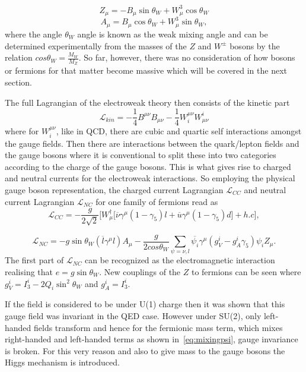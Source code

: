 \begin{equation}
	Z_{\mu}=-B_{\mu}\sin\theta_{W}+W^{3}_{\mu}\cos\theta_{W}
\end{equation}
\begin{equation}
	A_{\mu}= B_{\mu}\cos\theta_{W}+W^{3}_{\mu}\sin\theta_{W},
\end{equation}
where the angle $\theta_{W}$ angle is known as the weak mixing angle and can be determined experimentally from the masses of the $Z$ and $W^{\pm}$ bosons by the relation
$cos\theta_{W} = \frac{M_{W}}{M_{Z}}$. So far, however, there was no consideration of how bosons or fermions for that matter become massive which will be covered in the next section.

The full Lagrangian of the electroweak theory then consists of the kinetic part
\begin{equation}
\mathcal{L}_{kin}=  -\frac{1}{4} B^{\mu\nu}B_{\mu\nu} -\frac{1}{4} W_{i}^{\mu\nu}W^{i}_{\mu\nu}
\end{equation}
where for $W_{i}^{\mu\nu}$, like in \gls{QCD}, there are cubic and quartic self interactions amongst the gauge fields. Then there are interactions between the quark/lepton fields and the gauge bosons where it is conventional to split these into two categories according to the charge of the gauge bosons.
This is what gives rise to charged and neutral currents for the electroweak interactions. So employing the physical gauge boson representation, the charged current Lagrangian $\mathcal{L}_{CC}$ and neutral current Lagrangian $\mathcal{L}_{NC}$ for one family of fermions read as
\begin{equation}
	\mathcal{L}_{CC}= - \frac{g}{2\sqrt{2}}\Big[W_{\mu}^{\dagger}\big[\overline{\nu}\gamma^{\mu}(1-\gamma_{5})l + \overline{u}\gamma^{\mu}(1-\gamma_{5})d\big] + h.c\Big], 
\label{eq:LC}
\end{equation}

\begin{equation}
	\mathcal{L}_{NC}= - g \sin\theta_{W}(\overline{l}\gamma^{\mu}l)A_{\mu} - \frac{g}{2cos\theta_{W}}\sum_{\psi=\nu,l} \overline{\psi_{i}}\gamma^{\mu}(g^{i}_{V} - g^{i}_{A}\gamma_{5})\psi_{i}Z_{\mu}.
\label{eq:NC}
\end{equation}
The first part of $\mathcal{L}_{NC}$ can be recognized as the electromagnetic interaction realising that $e=g\sin\theta_{W}$. New couplings of the $Z$ to fermions can be seen where $g^{i}_{V}=I^{i}_{3}-2Q_{i}\sin^{2}\theta_{W}$ and $g^{i}_{A}=I^{i}_{3}$.

If the field is considered to be under U(1) charge then it was shown that this gauge field was invariant in the QED case. However under SU(2), only left-handed fields transform and hence for the fermionic mass term, which mixes right-handed and left-handed terms as shown in~\autoref{eq:mixingpsi}, gauge invariance is broken.
For this very reason and also to give mass to the gauge bosons the Higgs mechanism is introduced.

